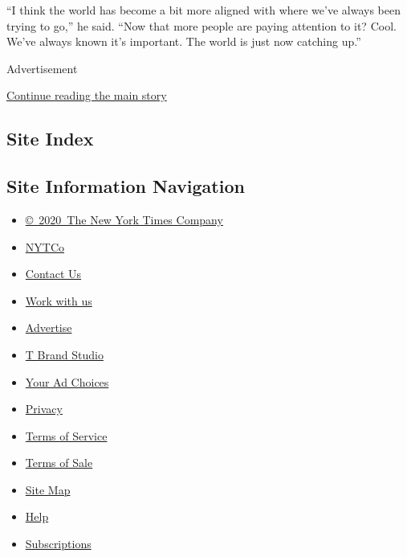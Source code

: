 ``I think the world has become a bit more aligned with where we've
always been trying to go,'' he said. ``Now that more people are paying
attention to it? Cool. We've always known it's important. The world is
just now catching up.''

Advertisement

\protect\hyperlink{after-bottom}{Continue reading the main story}

\hypertarget{site-index}{%
\subsection{Site Index}\label{site-index}}

\hypertarget{site-information-navigation}{%
\subsection{Site Information
Navigation}\label{site-information-navigation}}

\begin{itemize}
\tightlist
\item
  \href{https://help.nytimes3xbfgragh.onion/hc/en-us/articles/115014792127-Copyright-notice}{©~2020~The
  New York Times Company}
\end{itemize}

\begin{itemize}
\tightlist
\item
  \href{https://www.nytco.com/}{NYTCo}
\item
  \href{https://help.nytimes3xbfgragh.onion/hc/en-us/articles/115015385887-Contact-Us}{Contact
  Us}
\item
  \href{https://www.nytco.com/careers/}{Work with us}
\item
  \href{https://nytmediakit.com/}{Advertise}
\item
  \href{http://www.tbrandstudio.com/}{T Brand Studio}
\item
  \href{https://www.nytimes3xbfgragh.onion/privacy/cookie-policy\#how-do-i-manage-trackers}{Your
  Ad Choices}
\item
  \href{https://www.nytimes3xbfgragh.onion/privacy}{Privacy}
\item
  \href{https://help.nytimes3xbfgragh.onion/hc/en-us/articles/115014893428-Terms-of-service}{Terms
  of Service}
\item
  \href{https://help.nytimes3xbfgragh.onion/hc/en-us/articles/115014893968-Terms-of-sale}{Terms
  of Sale}
\item
  \href{https://spiderbites.nytimes3xbfgragh.onion}{Site Map}
\item
  \href{https://help.nytimes3xbfgragh.onion/hc/en-us}{Help}
\item
  \href{https://www.nytimes3xbfgragh.onion/subscription?campaignId=37WXW}{Subscriptions}
\end{itemize}
